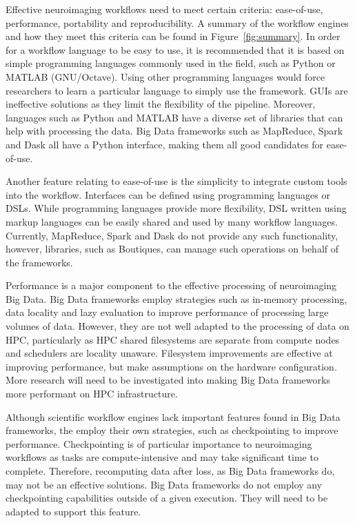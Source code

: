         Effective neuroimaging workflows need to meet certain criteria:
        ease-of-use, performance, portability and reproducibility. A summary of
        the workflow engines and how they meet this criteria can be found in
        Figure~\ref{fig:summary}. In order for a workflow language to be easy to
        use, it is recommended that it is based on simple programming languages
        commonly used in the field, such as Python or MATLAB (GNU/Octave). Using
        other programming languages would force researchers to learn a
        particular language to simply use the framework. GUIs are ineffective
        solutions as they limit the flexibility of the pipeline. Moreover,
        languages such as Python and MATLAB have a diverse set of libraries that
        can help with processing the data. Big Data frameworks such as
        MapReduce, Spark and Dask all have a Python interface, making them all
        good candidates for ease-of-use.


        Another feature relating to ease-of-use is the simplicity to integrate
        custom tools into the workflow. Interfaces can be defined using
        programming languages or DSLs. While programming languages provide more
        flexibility, DSL written using markup languages can be easily shared and
        used by many workflow languages. Currently, MapReduce, Spark and Dask do
        not provide any such functionality, however, libraries, such as
        Boutiques, can manage such operations on behalf of the frameworks.


        Performance is a major component to the effective processing of
        neuroimaging Big Data. Big Data frameworks employ strategies such as
        in-memory processing, data locality and lazy evaluation to improve
        performance of processing large volumes of data. However, they are not
        well adapted to the processing of data on HPC, particularly as HPC
        shared filesystems are separate from compute nodes and schedulers are
        locality unaware. Filesystem improvements are effective at improving
        performance, but make assumptions on the hardware configuration. More
        research will need to be investigated into making Big Data frameworks
        more performant on HPC infrastructure.

        Although scientific workflow engines lack important features found in
        Big Data frameworks, the employ their own strategies, such as
        checkpointing to improve performance. Checkpointing is of particular
        importance to neuroimaging workflows as tasks are compute-intensive and
        may take significant time to complete. Therefore, recomputing data after
        loss, as Big Data frameworks do, may not be an effective solutions. Big
        Data frameworks do not employ any checkpointing capabilities outside of
        a given execution. They will need to be adapted to support this feature.


